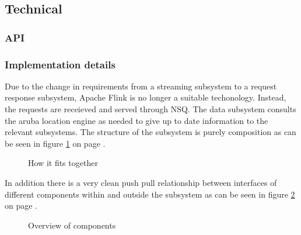 \subsection{Technical}
\subsubsection{API}
\subsubsection{Implementation details}
Due to the change in requirements from a streaming subsystem to a request response subsystem, Apache Flink is no longer a suitable techonology.
Instead, the requests are receieved and served through NSQ.
The data subsystem consults the aruba location engine as needed to give up to date information to the relevant subsystems. The structure of the subsystem is purely composition as can be seen in figure \ref{fig:data_class_diagram} on page \pageref{fig:data_class_diagram}.
\begin{figure}
    \caption{How it fits together}
    \label{fig:data_class_diagram}
\end{figure}
In addition there is a very clean push pull relationship between interfaces of different components within and outside the subsystem as can be seen in figure \ref{fig:data_component_diagram} on page \pageref{fig:data_component_diagram}.
\begin{figure}
    \caption{Overview of components}
    \label{fig:data_component_diagram}
\end{figure}

